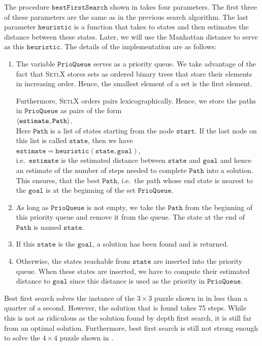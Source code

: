 The procedure $\mathtt{bestFirstSearch}$ shown in  takes four parameters.  The
first three of these parameters are the same as in the previous search algorithm.  The last parameter
$\mathtt{heuristic}$ is a function that takes to states and then estimates the distance between these states.
Later, we will use the Manhattan distance to serve as this $\mathtt{heuristic}$.  The details of the
implementation are as follows:
\begin{enumerate}
\item The variable $\mathtt{PrioQueue}$ serves as a priority queue.  We take advantage of the fact that
      \textsc{SetlX} stores sets as ordered binary trees that store their elements in increasing order.
      Hence, the smallest element of a set is the first element.

      Furthermore, \textsc{SetlX} orders pairs lexicographically.  Hence, we store the paths in
      $\mathtt{PrioQueue}$ as pairs of the form
      \\[0.2cm]
      \hspace*{1.3cm}
      $\pair(\mathtt{estimate}, \mathtt{Path})$.
      \\[0.2cm]
      Here $\mathtt{Path}$ is a list of states starting from the node $\mathtt{start}$.  If the last node on
      this list is called $\mathtt{state}$, then we have
      \\[0.2cm]
      \hspace*{1.3cm}
      $\mathtt{estimate} = \mathtt{heuristic}(\mathtt{state}, \mathtt{goal})$,
      \\[0.2cm]
      i.e.~$\mathtt{estimate}$ is the estimated distance between $\mathtt{state}$ and $\mathtt{goal}$ and hence
      an estimate of the number of steps needed to complete $\mathtt{Path}$ into a solution.  This ensures,
      that the best $\mathtt{Path}$, i.e.~the path whose end state is nearest to the $\mathtt{goal}$ is at the
      beginning of the set $\mathtt{PrioQueue}$.
\item As long as $\mathtt{PrioQueue}$ is not empty, we take the $\mathtt{Path}$ from the beginning of this
      priority queue and remove it from the queue.  The state at the end of $\mathtt{Path}$ is named $\mathtt{state}$.
\item If this $\mathtt{state}$ is the $\mathtt{goal}$, a solution has been found and is returned.
\item Otherwise, the states reachable from $\mathtt{state}$ are inserted into the priority queue.
      When these states are inserted, we have to compute their estimated distance to $\mathtt{goal}$ since this
      distance is used as the priority in $\mathtt{PrioQueue}$.
\end{enumerate}
Best first search solves the instance of the $3 \times 3$ puzzle shown in  in less than
a quarter of a second.  However, the solution that is found takes 75 steps.  While this is not as ridiculous as the
solution found by depth first search, it is still far from an optimal solution.  Furthermore,
best first search is still not strong enough to solve the $4 \times 4$ puzzle shown in
.

